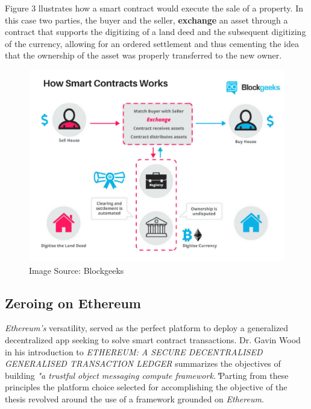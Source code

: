 \documentclass[submission,copyright,creativecommons]{eptcs}
\begin{document}
Figure 3 llustrates how a smart contract would execute the sale of a property.  In this case two parties, the buyer and the seller, \textbf{exchange} an asset through a contract that supports the digitizing of a land deed and the subsequent digitizing of the currency, allowing for an ordered settlement and thus cementing the idea that the ownership of the asset was properly transferred to the new owner\cite{WhatAreSmart}.
\begin{figure}
    \centering
    \label{fig:howsmartcontractsworks}
    \includegraphics[width=5in]{How-Smart-Contracts-Works-1.png}
     \caption{Image Source: Blockgeeks}
\end{figure}

\subsection{Zeroing on Ethereum}
\textit{Ethereum's} versatility, served as the perfect platform to deploy a generalized decentralized app seeking to solve smart contract transactions.  Dr. Gavin Wood in his introduction to \textit{ETHEREUM: A SECURE DECENTRALISED GENERALISED TRANSACTION LEDGER} summarizes the objectives of building \textit{"a trustful object messaging compute framework."}\cite{wood2014ethereum}Parting from these principles the platform choice selected for accomplishing the objective of the thesis  revolved around the use of a framework grounded on \textit{Ethereum}. 
\end{document}
